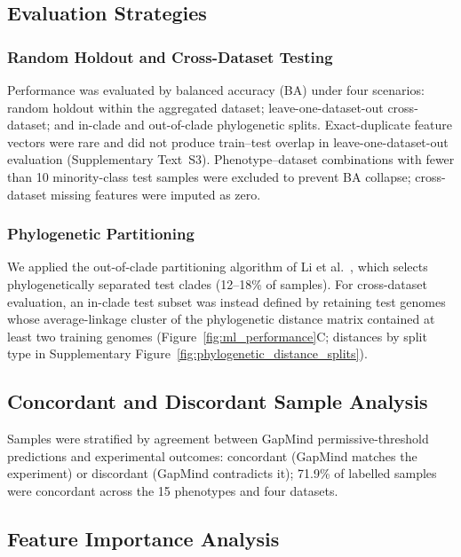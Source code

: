 \subsection*{Evaluation Strategies}

\subsubsection*{Random Holdout and Cross-Dataset Testing}

Performance was evaluated by balanced accuracy (BA) under four scenarios: random holdout within the aggregated dataset; leave-one-dataset-out cross-dataset; and in-clade and out-of-clade phylogenetic splits.
Exact-duplicate feature vectors were rare and did not produce train--test overlap in leave-one-dataset-out evaluation (Supplementary Text~S3).
Phenotype--dataset combinations with fewer than 10 minority-class test samples were excluded to prevent BA collapse; cross-dataset missing features were imputed as zero.

\subsubsection*{Phylogenetic Partitioning}

We applied the out-of-clade partitioning algorithm of Li et al.~\cite{Li2023-up}, which selects phylogenetically separated test clades (12--18\% of samples).
For cross-dataset evaluation, an in-clade test subset was instead defined by retaining test genomes whose average-linkage cluster of the phylogenetic distance matrix contained at least two training genomes (Figure~\ref{fig:ml_performance}C; distances by split type in Supplementary Figure~\ref{fig:phylogenetic_distance_splits}).

\subsection*{Concordant and Discordant Sample Analysis}

Samples were stratified by agreement between GapMind permissive-threshold predictions and experimental outcomes: concordant (GapMind matches the experiment) or discordant (GapMind contradicts it); 71.9\% of labelled samples were concordant across the 15 phenotypes and four datasets.

\subsection*{Feature Importance Analysis}

